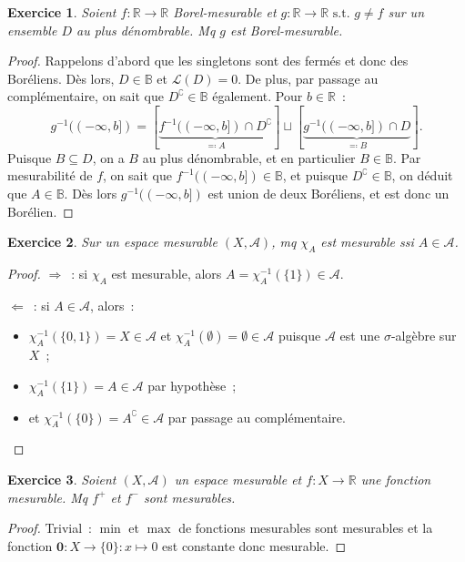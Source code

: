 \documentclass{article}
\newtheorem{ex}{Exercice}[section]
\theoremstyle{definition}
\newcommand{\minfty}{{-\infty}}
\newcommand{\st}{\text{ s.t. }}
\newcommand{\C}{\complement}
\newcommand{\R}{{\mathbb R}}
\newcommand{\B}{{\mathbb B}}
\begin{document}
\begin{ex} Soient $f : \R \to \R$ Borel-mesurable et $g : \R \to \R \st g \neq f$ sur un ensemble $D$ au plus dénombrable. Mq $g$ est Borel-mesurable.
\end{ex}

\begin{proof} Rappelons d'abord que les singletons sont des fermés et donc des Boréliens. Dès lors, $D \in \B$ et $\mathcal L(D) = 0$. De plus, par passage au complémentaire,
on sait que $D^\C \in \B$ également. Pour $b \in \R$~:
\[g^{-1}((\minfty, b]) = \left[\underbrace {f^{-1}((\minfty, b]) \cap D^\C}_{\eqqcolon A}\right] \sqcup \left[\underbrace {g^{-1}((\minfty, b]) \cap D}_{\eqqcolon B}\right].\]
Puisque $B \subseteq D$, on a $B$ au plus dénombrable, et en particulier $B \in \B$. Par mesurabilité de $f$, on sait que $f^{-1}((\minfty, b]) \in \B$, et puisque $D^\C \in \B$,
on déduit que $A \in \B$. Dès lors $g^{-1}((\minfty, b])$ est union de deux Boréliens, et est donc un Borélien.
\end{proof}

\begin{ex} Sur un espace mesurable $(X, \mathcal A)$, mq $\chi_A$ est mesurable ssi $A \in \mathcal A$.
\end{ex}

\begin{proof} \underline {$\Rightarrow$}~: si $\chi_A$ est mesurable, alors $A = \chi_A^{-1}(\{1\}) \in \mathcal A$.

\underline {$\Leftarrow$}~: si $A \in \mathcal A$, alors~:
\begin{itemize}
	\item $\chi_A^{-1}(\{0, 1\}) = X \in \mathcal A$ et $\chi_A^{-1}(\emptyset) = \emptyset \in \mathcal A$ puisque $\mathcal A$ est une $\sigma$-algèbre sur $X$~;
	\item $\chi_A^{-1}(\{1\}) = A \in \mathcal A$ par hypothèse~;
	\item et $\chi_A^{-1}(\{0\}) = A^\C \in \mathcal A$ par passage au complémentaire.
\end{itemize}
\end{proof}

\begin{ex} Soient $(X, \mathcal A)$ un espace mesurable et $f : X \to \R$ une fonction mesurable. Mq $f^+$ et $f^-$ sont mesurables.
\end{ex}

\begin{proof} Trivial~: $\min$ et $\max$ de fonctions mesurables sont mesurables et la fonction $\mathbf 0 : X \to \{0\} : x \mapsto 0$ est constante donc mesurable.
\end{proof}
\end{document}
